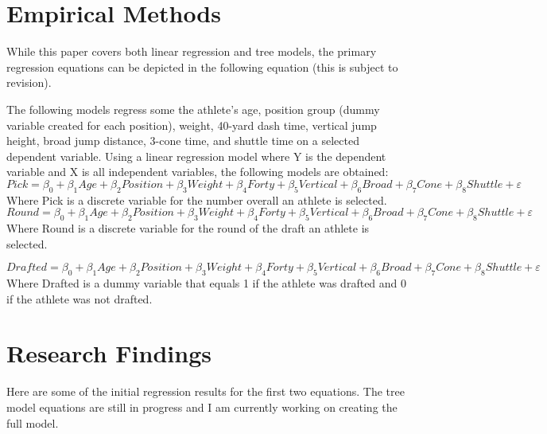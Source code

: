 \documentclass[12pt,english]{article}
\begin{document}
\section{Empirical Methods}\label{sec:methods}
While this paper covers both linear regression and tree models, the primary regression equations can be depicted in the following equation (this is subject to revision). 

The following models regress some the athlete's age, position group (dummy variable created for each position), weight, 40-yard dash time, vertical jump height, broad jump distance, 3-cone time, and shuttle time on a selected dependent variable. Using a linear regression model where Y is the dependent variable and X is all independent variables, the following models are obtained:
\begin{equation}
\label{eq:1}
Pick=\beta_{0} + \beta_{1}Age + \beta_{2}Position + \beta_{3}Weight + \beta_{4}Forty + \beta_{5}Vertical + \beta_{6}Broad + \beta_{7}Cone + \beta_{8}Shuttle + \varepsilon
\label{eq:2}
\end{equation}
Where Pick is a discrete variable for the number overall an athlete is selected. 
\begin{equation}
\label{eq:2}
Round=\beta_{0} + \beta_{1}Age + \beta_{2}Position + \beta_{3}Weight + \beta_{4}Forty + \beta_{5}Vertical + \beta_{6}Broad + \beta_{7}Cone + \beta_{8}Shuttle + \varepsilon    
\end{equation}
Where Round is a discrete variable for the round of the draft an athlete is selected.

\begin{equation}
\label{eq:3}
Drafted=\beta_{0} + \beta_{1}Age + \beta_{2}Position + \beta_{3}Weight + \beta_{4}Forty + \beta_{5}Vertical + \beta_{6}Broad + \beta_{7}Cone + \beta_{8}Shuttle + \varepsilon
\end{equation}
Where Drafted is a dummy variable that equals 1 if the athlete was drafted and 0 if the athlete was not drafted. 


\section{Research Findings}\label{sec:results}
Here are some of the initial regression results for the first two equations. The tree model equations are still in progress and I am currently working on creating the full model. 
\end{document}
